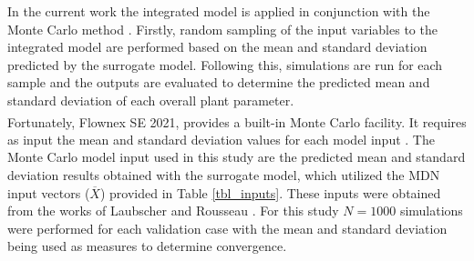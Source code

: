 \documentclass[a4paper,fleqn]{cas-sc}
\begin{document}
In the current work the integrated model is applied in conjunction with the Monte Carlo method \cite{Thomopoulos2013}. Firstly, random sampling of the input variables to the integrated model are performed based on the mean and standard deviation predicted by the surrogate model.  Following this, simulations are run for each sample and the outputs are evaluated to determine the predicted mean and standard deviation of each overall plant parameter.\\

Fortunately, Flownex SE\textsuperscript{\textregistered} 2021, provides a built-in Monte Carlo facility. It requires as input the mean and standard deviation values for each model input \cite{flownex}. The Monte Carlo model input used in this study are the predicted mean and standard deviation results obtained with the surrogate model, which utilized the MDN input vectors ($\overline{X}$) provided in Table \ref{tbl_inputs}. These inputs were obtained from the works of Laubscher and Rousseau \cite{Laubscher2019b}. For this study $N=1000$ simulations were performed for each validation case with the mean and standard deviation being used as measures to determine convergence. \\
\end{document}
